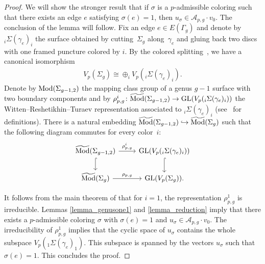 \documentclass[pdftex]{sigma}
\numberwithin{equation}{section}
\begin{document}
\begin{proof} We will show the stronger result that if $\sigma$ is a $p$-admissible coloring such that there exists an edge $e$ satisfying $\sigma(e)=1$, then $u_{\sigma}\in \mathcal{A}_{p,g}\cdot v_0$. The conclusion of the lemma will follow. Fix an edge $e\in E(\Gamma_g)$ and denote by $_i\Sigma(\gamma_e)_i$ the surface obtained by cutting~$\Sigma_g$ along~$\gamma_e$ and gluing back two discs with one framed puncture colored by $i$. By the colored splitting~\cite[Theorem~1.4]{BHMV2}, we have a canonical isomorphism
\begin{gather*} V_p(\Sigma_g) \cong \oplus_i V_p(_i\Sigma(\gamma_e)_i).\end{gather*}
Denote by $\operatorname{Mod}(\Sigma_{g-1,2})$ the mapping class group of a genus $g-1$ surface with two boundary components and by $\rho_{p,g}^i \colon \widetilde{\operatorname{Mod}}(\Sigma_{g-1, 2})\rightarrow \operatorname{GL}(V_p(_i\Sigma(\gamma_e)_i))$ the Witten--Reshetikhin--Turaev representation associated to $_i\Sigma(\gamma_e)_i$ (see~\cite{BHMV2} for definitions). There is a natural embedding $\widetilde{\operatorname{Mod}}(\Sigma_{g-1, 2}) \hookrightarrow \widetilde{\operatorname{Mod}}(\Sigma_g)$ such that the following diagram commutes for every color~$i$:
\begin{equation*}\begin{tikzcd}
 \widetilde{\Mod}(\Sigma_{g-1, 2}) \arrow[d, hook, ""] \arrow[r, "\rho_{p,g}^i"] &
 \GL(V_p(_i\Sigma(\gamma_e)_i)) \arrow[d, hook, ""] \\
 \emcg \arrow[r, "\rho_{p,g}"]
& \GL(V_p(\Sigma_g)).
\end{tikzcd}\end{equation*}

It follows from the main theorem of \cite{KoberdaSantharoubane17} that for $i=1$, the representation $\rho_{p,g}^1$ is irreducible. Lemmas \ref{lemma_genusone1} and \ref{lemma_reduction} imply that there exists a $p$-admissible coloring $\sigma$ with $\sigma(e)=1$ and \mbox{$u_{\sigma} \in \mathcal{A}_{p,g}\cdot v_0$}. The irreducibility of $\rho_{p,g}^1$ implies that the cyclic space of $u_{\sigma}$ contains the whole subspace $V_p(_1\Sigma(\gamma_e)_1)$. This subspace is spanned by the vectors $u_{\sigma}$ such that $\sigma(e)=1$. This concludes the proof.
\end{proof}
\end{document}
